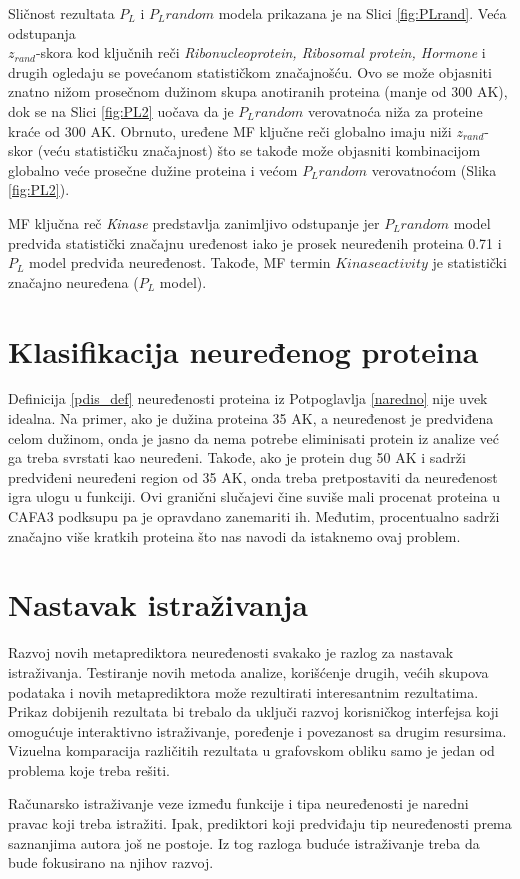 Sličnost rezultata $P_L$ i $P_L random$ modela prikazana je na Slici
\ref{fig:PLrand}. Veća odstupanja \\$z_{rand}$-skora kod ključnih reči
\textit{Ribonucleoprotein, Ribosomal protein, Hormone} i drugih ogledaju se
povećanom statističkom značajnošću. Ovo se može objasniti znatno
nižom prosečnom dužinom skupa anotiranih proteina (manje od 300 AK), dok se na
Slici \ref{fig:PL2} uočava da je $P_L random$ verovatnoća niža za proteine
kraće od 300 AK.  Obrnuto, uređene MF ključne reči globalno imaju niži
$z_{rand}$-skor (veću statističku značajnost) što se takođe može objasniti
kombinacijom globalno veće prosečne dužine proteina i većom $P_L random$
verovatnoćom (Slika \ref{fig:PL2}). 

MF ključna reč \textit{Kinase} predstavlja zanimljivo odstupanje jer $P_L
random$ model predviđa statistički značajnu uređenost iako je prosek neuređenih
proteina 0.71 i $P_L$ model predviđa neuređenost. Takođe, MF termin $Kinase
activity$ je statistički značajno neuređena ($P_L$ model).

\section{Klasifikacija neuređenog proteina}

Definicija \ref{pdis_def} neuređenosti proteina iz Potpoglavlja
\ref{naredno} nije uvek idealna.  Na primer, ako je dužina proteina 35 AK, a
neuređenost je predviđena celom dužinom, onda je jasno da nema potrebe eliminisati
protein iz analize već ga treba svrstati kao neuređeni.  Takođe, ako je protein
dug 50 AK i sadrži predviđeni neuređeni region od 35 AK, onda treba
pretpostaviti da neuređenost igra ulogu u funkciji. Ovi granični slučajevi čine
suviše mali procenat proteina u CAFA3 podksupu pa je opravdano zanemariti ih.
Međutim, procentualno \swissprot sadrži značajno više kratkih proteina što nas
navodi da istaknemo ovaj problem.

\section{Nastavak istraživanja}

Razvoj novih metaprediktora neuređenosti \cite{Meng_c2017} svakako je razlog za
nastavak istraživanja. Testiranje novih metoda analize, korišćenje drugih,
većih skupova podataka i novih metaprediktora može rezultirati interesantnim
rezultatima. Prikaz dobijenih rezultata bi trebalo da uključi razvoj
korisničkog interfejsa koji omogućuje interaktivno istraživanje, poređenje i
povezanost sa drugim resursima. Vizuelna komparacija različitih rezultata u
grafovskom obliku samo je jedan od problema koje treba rešiti.

Računarsko istraživanje veze između funkcije i tipa neuređenosti je naredni
pravac koji treba istražiti. Ipak, prediktori koji predviđaju tip neuređenosti
prema saznanjima autora još ne postoje. Iz tog razloga buduće istraživanje
treba da bude fokusirano na njihov razvoj.

